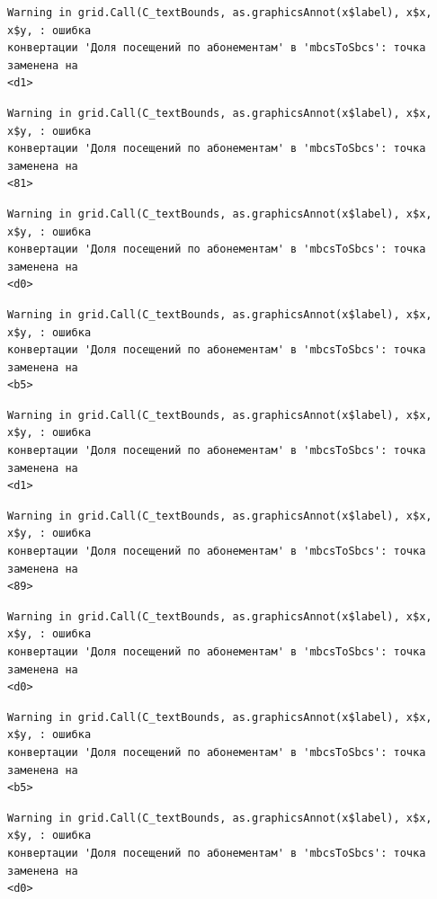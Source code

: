 \documentclass[
  letterpaper,
  DIV=11,
  numbers=noendperiod]{scrreprt}
\begin{document}
\begin{verbatim}
Warning in grid.Call(C_textBounds, as.graphicsAnnot(x$label), x$x, x$y, : ошибка
конвертации 'Доля посещений по абонементам' в 'mbcsToSbcs': точка заменена на
<d1>
\end{verbatim}

\begin{verbatim}
Warning in grid.Call(C_textBounds, as.graphicsAnnot(x$label), x$x, x$y, : ошибка
конвертации 'Доля посещений по абонементам' в 'mbcsToSbcs': точка заменена на
<81>
\end{verbatim}

\begin{verbatim}
Warning in grid.Call(C_textBounds, as.graphicsAnnot(x$label), x$x, x$y, : ошибка
конвертации 'Доля посещений по абонементам' в 'mbcsToSbcs': точка заменена на
<d0>
\end{verbatim}

\begin{verbatim}
Warning in grid.Call(C_textBounds, as.graphicsAnnot(x$label), x$x, x$y, : ошибка
конвертации 'Доля посещений по абонементам' в 'mbcsToSbcs': точка заменена на
<b5>
\end{verbatim}

\begin{verbatim}
Warning in grid.Call(C_textBounds, as.graphicsAnnot(x$label), x$x, x$y, : ошибка
конвертации 'Доля посещений по абонементам' в 'mbcsToSbcs': точка заменена на
<d1>
\end{verbatim}

\begin{verbatim}
Warning in grid.Call(C_textBounds, as.graphicsAnnot(x$label), x$x, x$y, : ошибка
конвертации 'Доля посещений по абонементам' в 'mbcsToSbcs': точка заменена на
<89>
\end{verbatim}

\begin{verbatim}
Warning in grid.Call(C_textBounds, as.graphicsAnnot(x$label), x$x, x$y, : ошибка
конвертации 'Доля посещений по абонементам' в 'mbcsToSbcs': точка заменена на
<d0>
\end{verbatim}

\begin{verbatim}
Warning in grid.Call(C_textBounds, as.graphicsAnnot(x$label), x$x, x$y, : ошибка
конвертации 'Доля посещений по абонементам' в 'mbcsToSbcs': точка заменена на
<b5>
\end{verbatim}

\begin{verbatim}
Warning in grid.Call(C_textBounds, as.graphicsAnnot(x$label), x$x, x$y, : ошибка
конвертации 'Доля посещений по абонементам' в 'mbcsToSbcs': точка заменена на
<d0>
\end{verbatim}
\end{document}
